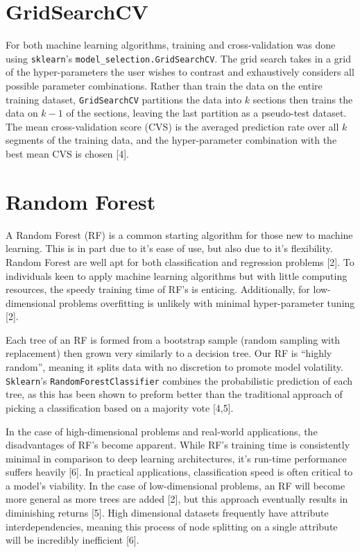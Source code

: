 \documentclass{article}
\begin{document}
\section{GridSearchCV}
For both machine learning algorithms, training and cross-validation was done using \verb+sklearn+'s \verb+model_selection.GridSearchCV+. The grid search takes in a grid of the hyper-parameters the user wishes to contrast and exhaustively considers all possible parameter combinations. Rather than train the data on the entire training dataset, \verb+GridSearchCV+ partitions the data into $k$ sections then trains the data on $k-1$ of the sections, leaving the last partition as a pseudo-test dataset. The mean cross-validation score (CVS) is the averaged prediction rate over all $k$ segments of the training data, and the hyper-parameter combination with the best mean CVS is chosen [4].

\section{Random Forest}
A Random Forest (RF) is a common starting algorithm for those new to machine learning. This is in part due to it's ease of use, but also due to it's flexibility. Random Forest are well apt for both classification and regression problems [2]. To individuals keen to apply machine learning algorithms but with little computing resources, the speedy training time of RF's is enticing. Additionally, for low-dimensional problems overfitting is unlikely with minimal hyper-parameter tuning [2].

Each tree of an RF is formed from a bootstrap sample (random sampling with replacement) then grown very similarly to a decision tree. Our RF is ``highly random'', meaning it splits data with no discretion to promote model volatility. \verb+Sklearn+'s \verb+RandomForestClassifier+ combines the probabilistic prediction of each tree, as this has been shown to preform better than the traditional approach of picking a classification based on a majority vote [4,5].

In the case of high-dimensional problems and real-world applications, the disadvantages of RF's become apparent. While RF's training time is consistently minimal in comparison to deep learning architectures, it's run-time performance suffers heavily [6]. In practical applications, classification speed is often critical to a model's viability. In the case of low-dimensional problems, an RF will become more general as more trees are added [2], but this approach eventually results in diminishing returns [5]. High dimensional datasets frequently have attribute interdependencies, meaning this process of node splitting on a single attribute will be incredibly inefficient [6].
\end{document}
